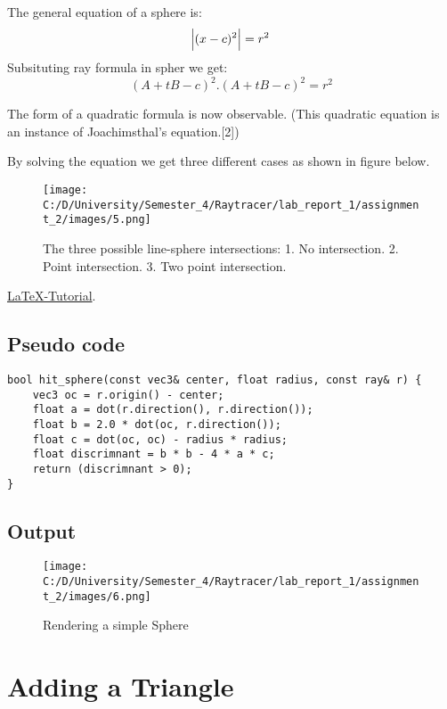 \documentclass{article}
\begin{document}
The general equation of a sphere is: \[ \abs{(x - c)^2} = r^2\] 
Subsituting ray formula in spher we get: 
\[ (A + tB - c)^2.(A + tB - c)^2 = r^2\] 

The form of a quadratic formula is now observable. (This quadratic equation is an instance of Joachimsthal's equation.[2])

By solving the equation we get three different cases as shown in figure below.
\begin{figure}[h]
	
	\texttt{[image: C:/D/University/Semester\_4/Raytracer/lab\_report\_1/assignment\_2/images/5.png]}
	
	\caption{The three possible line-sphere intersections:
		1. No intersection.
		2. Point intersection.
		3. Two point intersection.}
	\label{fig:boat1}
\end{figure}
\href{https://en.wikipedia.org/wiki/Line%E2%80%93sphere_intersection}{LaTeX-Tutorial}.
\subsection{Pseudo code}
\begin{lstlisting}
bool hit_sphere(const vec3& center, float radius, const ray& r) {
	vec3 oc = r.origin() - center;
	float a = dot(r.direction(), r.direction());
	float b = 2.0 * dot(oc, r.direction());
	float c = dot(oc, oc) - radius * radius;
	float discrimnant = b * b - 4 * a * c;
	return (discrimnant > 0);
}
\end{lstlisting}


\subsection{Output}
\begin{figure}[h]
		\begin{center}
	\texttt{[image: C:/D/University/Semester\_4/Raytracer/lab\_report\_1/assignment\_2/images/6.png]}
	
	\caption{Rendering a simple Sphere}
	\label{fig:boat1}
		\end{center}
\end{figure}



\section{Adding a Triangle}
\end{document}
